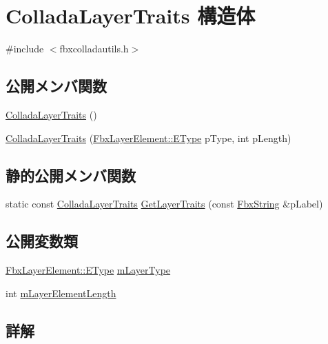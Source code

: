 \hypertarget{struct_collada_layer_traits}{}\section{Collada\+Layer\+Traits 構造体}
\label{struct_collada_layer_traits}


{\ttfamily \#include $<$fbxcolladautils.\+h$>$}

\subsection*{公開メンバ関数}
\begin{DoxyCompactItemize}
\item 
\hyperlink{struct_collada_layer_traits_a53f06a4cc0a322c53a835f89bca19caf}{Collada\+Layer\+Traits} ()
\item 
\hyperlink{struct_collada_layer_traits_a823980f2de7a3b074c41add0b972fb78}{Collada\+Layer\+Traits} (\hyperlink{class_fbx_layer_element_a8c95c5cd880b56c776acd379bd86f42c}{Fbx\+Layer\+Element\+::\+E\+Type} p\+Type, int p\+Length)
\end{DoxyCompactItemize}
\subsection*{静的公開メンバ関数}
\begin{DoxyCompactItemize}
\item 
static const \hyperlink{struct_collada_layer_traits}{Collada\+Layer\+Traits} \hyperlink{struct_collada_layer_traits_ab540128a228dc27186beca5c5dd5f707}{Get\+Layer\+Traits} (const \hyperlink{class_fbx_string}{Fbx\+String} \&p\+Label)
\end{DoxyCompactItemize}
\subsection*{公開変数類}
\begin{DoxyCompactItemize}
\item 
\hyperlink{class_fbx_layer_element_a8c95c5cd880b56c776acd379bd86f42c}{Fbx\+Layer\+Element\+::\+E\+Type} \hyperlink{struct_collada_layer_traits_a3e6c41211a794e53cfc029a7c7093784}{m\+Layer\+Type}
\item 
int \hyperlink{struct_collada_layer_traits_a101229f9fd16ad7c7e751ad716008704}{m\+Layer\+Element\+Length}
\end{DoxyCompactItemize}


\subsection{詳解}


